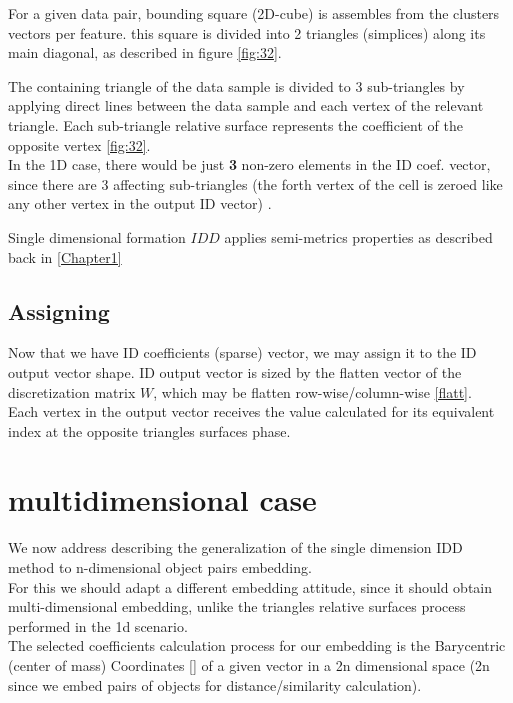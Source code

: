 \begin{}
\begin{figure}[h]
		\end{figure} 
		
		
		
		
		
		
		
		For a given data pair, bounding square (2D-cube) is assembles from the clusters vectors per feature.
		this square is divided into 2 triangles (simplices) along its main diagonal, as described in figure \ref{fig:32}.
		
		The containing triangle of the data sample is divided to 3 sub-triangles by applying direct lines between the data sample and each vertex of the relevant triangle. Each sub-triangle relative surface represents the coefficient of the opposite vertex \ref{fig:32}. \\ 
		In the 1D case, there would be just \textbf{3} non-zero elements in the ID coef. vector, since there are 3 affecting sub-triangles (the forth vertex of the cell is zeroed like any other vertex in the output ID vector) .
				
		Single dimensional formation $IDD$ applies semi-metrics properties as described back in \ref{Chapter1}
		
			
	\subsection{Assigning}
	Now that we have ID coefficients (sparse) vector, we may assign it to the ID output vector shape.
	ID output vector is sized by the flatten vector of the discretization matrix $W$, which may be flatten row-wise/column-wise \ref{flatt}.\\
	Each vertex in the output vector receives the value calculated for its equivalent index at the opposite triangles surfaces phase.
	


\section{multidimensional case}

We now address describing the generalization of the single dimension IDD method to n-dimensional object pairs embedding. \\
For this we should adapt a different embedding attitude, since it should obtain multi-dimensional embedding, unlike the triangles relative surfaces process performed in the 1d scenario.  \\
The selected coefficients calculation process for our embedding is the Barycentric (center of mass) Coordinates [] of a given vector in a 2n dimensional space (2n since we embed pairs of objects for distance/similarity calculation).


\end{}
